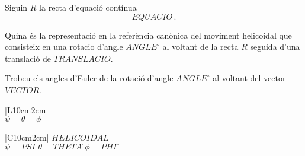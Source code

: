 \begin{enunciat}
Siguin $R$ la recta d'equació contínua
\[
  EQUACIO\,.
\]
\begin{apartats}
\item Quina és la representació en la referència canònica del moviment helicoidal que consisteix en una rotacio d'angle $ANGLE^\circ$ al voltant de la recta $R$ seguida d'una translació de $TRANSLACIO$.
\item Trobeu els angles d'Euler de la rotació d'angle $ANGLE^\circ$ al voltant del vector $VECTOR$.
\end{apartats}
\end{enunciat}

\begin{quadricula}
\begin{tabular}{|L{10cm}{2cm}|}
\hline
  \\
\hline
{}
{$\psi=$\hspace{3.5cm}$\theta=$\hspace{3.5cm}$\phi=$\hspace{3.5cm}} \\
\hline
\end{tabular}
\end{quadricula}

\begin{solucio}
\begin{center}
\begin{tabular}{|C{10cm}{2cm}|}
\hline
$HELICOIDAL$ \\
\hline
{}
{$\psi=PSI^\circ$\hspace{1.7cm}$\theta=THETA^\circ$\hspace{1.7cm}$\phi=PHI^\circ$} \\
\hline
\end{tabular}
\end{center}
\end{solucio}



